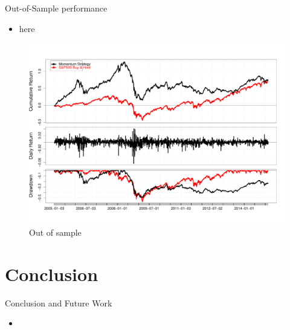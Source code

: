 \documentclass{beamer}
\makeatletter
\def\maxwidth{ %
	\ifdim\Gin@nat@width>\linewidth
	\linewidth
	\else
	\Gin@nat@width
	\fi
}
\makeatother
\begin{document}
\begin{frame}{Out-of-Sample performance}
	\begin{itemize}
		\item here
	\end{itemize}
	
	\begin{figure}
		\includegraphics[width=\maxwidth]{figures/FinalOut}
		\caption{\label{fig:your-figure}Out of sample}
	\end{figure}
\end{frame}

\section{Conclusion}
\begin{frame}{Conclusion and Future Work}
	\begin{itemize}
		\item
	\end{itemize}
\end{frame}
\end{document}
